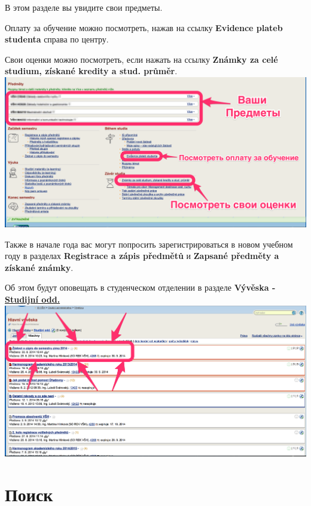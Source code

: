 \documentclass[a4paper,12pt]{article}
\begin{document}
В этом разделе вы увидите свои предметы.

Оплату за обучение можно посмотреть, 
нажав на ссылку \textbf{Evidence plateb studenta} справа по центру.

Свои оценки можно посмотреть, 
если нажать 
на ссылку \textbf{Známky za celé studium, získané kredity a stud. průměr}. \\

\includegraphics[width=\textwidth]{s18} \\

\newpage

Также в начале года вас могут попросить зарегистрироваться в новом учебном году в разделах
\textbf{Registrace a zápis předmětů} и \textbf{Zapsané předměty a získané známky}.

Об этом будут оповещать 
в студенческом отделении в разделе 
\textbf{Vývěska - \href{https://is.vsh.cz/auth/bb/skola/studijni/}{Studijní odd.}} \\

\includegraphics[width=\textwidth]{s19} \\

\newpage

\section{Поиск}
\end{document}
